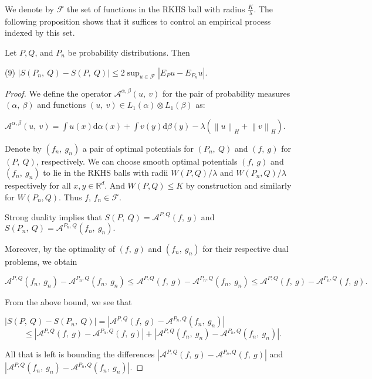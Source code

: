 	We denote by $\mathcal{F}$ the set of functions in the RKHS ball with radius $\frac{K}{\lambda}$. The following proposition shows that it suffices to control an empirical process indexed by this set.
	
	\begin{prop}
		Let $P, Q$, and $P_{n}$ be probability distributions.
		Then
		\begin{center}
			(9)   $|S(P_{n},\displaystyle \ Q)-S(P,\ Q)|\leq 2\sup_{u\in \mathcal{F}}|E_{P}u-E_{P_n}u|.$
		\end{center}
	\end{prop}
	
	\begin{proof}
		
		We define the operator $\mathcal{A}^{\alpha,\beta}(u,\ v)$ for the pair of probability measures $(\alpha,\ \beta)$ and functions $(u,\ v)\in L_{1}(\alpha)\otimes L_{1}(\beta)$ as:
		
		$\displaystyle \mathcal{A}^{\alpha,\beta}(u,\ v)=\int u(x)\mathrm{d}\alpha(x)+\int v(y)\mathrm{d}\beta(y)-\lambda(\left\|u\right\|_H+\left\|v\right\|_H).$
		
		Denote by $(f_{n},\ g_{n})$ a pair of optimal potentials for $(P_{n},\ Q)$ and $(f,\ g)$ for $(P,\ Q)$, respectively. We can choose smooth optimal potentials $(f,\ g)$ and $(f_{n},\ g_{n})$ to lie in the RKHS balls with radii $W(P,Q)/\lambda$ and $W(P_n,Q)/\lambda$ respectively for all $x, y\in \mathbb{R}^{d}.$ And $W(P,Q)\leq K$ by construction and similarly for $W(P_n,Q)$. Thus $f$, $f_n\in \mathcal{F}$.
		
		Strong duality implies that $S(P,\ Q)=\mathcal{A}^{P,Q}(f,\ g)$ and $S(P_{n},\ Q)=\mathcal{A}^{P_{n},Q}(f_{n},\ g_{n}).$
		
		Moreover, by the optimality of $(f,\ g)$ and $(f_{n},\ g_{n})$ for their respective dual problems, we obtain
		
		$$\mathcal{A}^{P,Q}(f_{n},\ g_{n})-\mathcal{A}^{P_{n},Q}(f_{n},\ g_{n})\leq \mathcal{A}^{P,Q}(f,\ g)-\mathcal{A}^{P_{n},Q}(f_{n},\ g_{n})\leq \mathcal{A}^{P,Q}(f,\ g)-\mathcal{A}^{P_{n},Q}(f,\ g).$$
		
		From the above bound, we see that
		
		$|S(P,\ Q)-S(P_{n},\ Q)|=|\mathcal{A}^{P,Q}(f,\ g)-\mathcal{A}^{P_{n},Q}(f_{n},\ g_{n})|$
		$$
		\leq|\mathcal{A}^{P,Q}(f,\ g)-\mathcal{A}^{P_{n},Q}(f,\ g)|+|\mathcal{A}^{P,Q}(f_{n},\ g_{n})-\mathcal{A}^{P_{n},Q}(f_{n},\ g_{n})|.
		$$
		
		All that is left is bounding the differences $|\mathcal{A}^{P,Q}(f,\ g)-\mathcal{A}^{P_{n},Q}(f,\ g)|$ and $|\mathcal{A}^{P,Q}(f_{n},\ g_{n})- \mathcal{A}^{P_{n},Q}(f_{n},\ g_{n})|.$
		

\end{proof}
